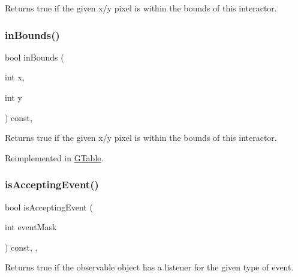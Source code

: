 Returns true if the given x/y pixel is within the bounds of this interactor. 

\mbox{\label{classGInteractor_ae6d7982c1c627b677a5e776ca86118ed}} 
\subsubsection{\texorpdfstring{in\+Bounds()}{inBounds()}\hspace{0.1cm}{\footnotesize\ttfamily [2/2]}}
{\footnotesize\ttfamily bool in\+Bounds (\begin{DoxyParamCaption}\item[{int}]{x,  }\item[{int}]{y }\end{DoxyParamCaption}) const\hspace{0.3cm}{\ttfamily [virtual]}, {\ttfamily [inherited]}}



Returns true if the given x/y pixel is within the bounds of this interactor. 



Reimplemented in \mbox{\hyperlink{classGTable_afa6b6241d2f7af75f2d1345f46acfc35}{G\+Table}}.

\mbox{\label{classGObservable_aeec1adc19aa0f33de62390686ee1382c}} 
\subsubsection{\texorpdfstring{is\+Accepting\+Event()}{isAcceptingEvent()}\hspace{0.1cm}{\footnotesize\ttfamily [1/3]}}
{\footnotesize\ttfamily bool is\+Accepting\+Event (\begin{DoxyParamCaption}\item[{int}]{event\+Mask }\end{DoxyParamCaption}) const\hspace{0.3cm}{\ttfamily [protected]}, {\ttfamily [virtual]}, {\ttfamily [inherited]}}



Returns true if the observable object has a listener for the given type of event. 

